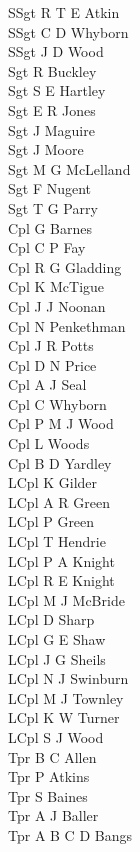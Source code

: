 \begin{multicols}{3}
  \small
  \noindent
  SSgt R T E Atkin \\
  SSgt C D Whyborn \\
  SSgt J D Wood \\
  Sgt R Buckley \\
  Sgt S E Hartley \\
  Sgt E R Jones \\
  Sgt J Maguire \\
  Sgt J Moore \\
  Sgt M G McLelland \\
  Sgt F Nugent \\
  Sgt T G Parry \\
  Cpl G Barnes \\
  Cpl C P Fay \\
  Cpl R G Gladding \\
  Cpl K McTigue \\
  Cpl J J Noonan \\
  Cpl N Penkethman \\
  Cpl J R Potts \\
  Cpl D N Price \\
  Cpl A J Seal \\
  Cpl C Whyborn \\
  Cpl P M J Wood \\
  Cpl L Woods \\
  Cpl B D Yardley \\
  LCpl K Gilder \\
  LCpl A R Green \\
  LCpl P Green \\
  LCpl T Hendrie \\
  LCpl P A Knight \\
  LCpl R E Knight \\
  LCpl M J McBride \\
  LCpl D Sharp \\
  LCpl G E Shaw \\
  LCpl J G Sheils \\
  LCpl N J Swinburn \\
  LCpl M J Townley \\
  LCpl K W Turner \\
  LCpl S J Wood \\
  Tpr B C Allen \\
  Tpr P Atkins \\
  Tpr S Baines \\
  Tpr A J Baller \\
  Tpr A B C D Bangs \\

\end{multicols}
